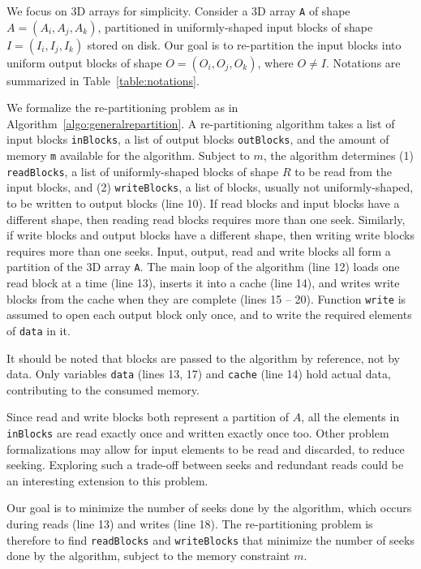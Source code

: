 \documentclass[sigconf, nonacm]{acmart}
\begin{document}
We focus on 3D arrays for simplicity. Consider a 3D array \texttt{A} of shape $A =
(A_i, A_j, A_k)$, partitioned in uniformly-shaped input blocks of shape $I =
(I_i, I_j, I_k)$ stored on disk. Our goal is to re-partition the input
blocks into uniform output blocks of shape $O = (O_i, O_j, O_k)$,
where $O \neq I$. Notations are summarized in
Table~\ref{table:notations}.

We formalize the re-partitioning problem as in Algorithm~\ref{algo:generalrepartition}.
A re-partitioning algorithm takes a
list of input blocks \texttt{inBlocks}, a list of output
blocks \texttt{outBlocks}, and the amount of memory \texttt{m}
available for the algorithm. Subject to $m$, the algorithm determines (1)
\texttt{readBlocks}, a list of uniformly-shaped blocks of shape $R$ to be read from the
input blocks, and (2) \texttt{writeBlocks}, a list of blocks,
usually not uniformly-shaped, to be written to output blocks (line 10).
If read blocks and input blocks have a different shape, then reading read blocks requires
more than one seek. Similarly, if write blocks and output blocks have a different shape,
then writing write blocks requires more than one seeks. Input, output, read
and write blocks all form a partition of the 3D array \texttt{A}. The
main loop of the algorithm (line 12) loads one read block at a time (line
13), inserts it into a cache (line 14), and writes write blocks from the
cache when they are complete (lines 15 -- 20). Function \texttt{write} is assumed
to open each output block only once, and to write the required elements of \texttt{data} in it.

It should be noted that blocks are passed to the algorithm by reference,
not by data. Only variables \texttt{data} (lines 13, 17) and \texttt{cache}
(line 14) hold actual data, contributing to the consumed memory.

Since read and write blocks both represent a partition of $A$, all the
elements in \texttt{inBlocks} are read exactly once and written exactly once too. Other
problem formalizations may allow for input elements to be read and
discarded, to reduce seeking. Exploring such a trade-off
between seeks and redundant reads could be an interesting extension to this problem.

Our goal is to minimize the number of seeks done by the algorithm, which
occurs during reads (line 13) and writes (line 18). The re-partitioning
problem is therefore to find \texttt{readBlocks} and \texttt{writeBlocks} that
minimize the number of
seeks done by the algorithm, subject to the memory constraint $m$.
\end{document}
